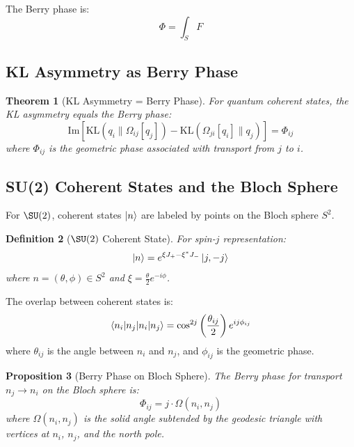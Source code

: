 \documentclass[11pt,a4paper]{article}
\newtheorem{theorem}{Theorem}[section]
\newtheorem{proposition}[theorem]{Proposition}
\newtheorem{definition}[theorem]{Definition}
\newcommand{\KL}{\mathrm{KL}}
\begin{document}
The Berry phase is:
\begin{equation}
    \Phi = \int_S F
\end{equation}

\subsection{KL Asymmetry as Berry Phase}

\begin{theorem}[KL Asymmetry = Berry Phase]\label{thm:berry}
For quantum coherent states, the KL asymmetry equals the Berry phase:
\begin{equation}
    \boxed{\mathrm{Im}\left[\KL(q_i \| \Omega_{ij}[q_j]) - \KL(\Omega_{ji}[q_i] \| q_j)\right] = \Phi_{ij}}
\end{equation}
where $\Phi_{ij}$ is the geometric phase associated with transport from $j$ to $i$.
\end{theorem}

\subsection{SU(2) Coherent States and the Bloch Sphere}

For $\SU(2)$, coherent states $\ket{n}$ are labeled by points on the Bloch sphere $S^2$.

\begin{definition}[$\SU(2)$ Coherent State]
For spin-$j$ representation:
\begin{equation}
    \ket{n} = e^{\xi J_+ - \xi^* J_-} \ket{j, -j}
\end{equation}
where $n = (\theta, \phi) \in S^2$ and $\xi = \frac{\theta}{2} e^{-i\phi}$.
\end{definition}

The overlap between coherent states is:
\begin{equation}
    \braket{n_i | n_j} = \cos^{2j}\left(\frac{\theta_{ij}}{2}\right) e^{ij\phi_{ij}}
\end{equation}
where $\theta_{ij}$ is the angle between $n_i$ and $n_j$, and $\phi_{ij}$ is the geometric phase.

\begin{proposition}[Berry Phase on Bloch Sphere]
The Berry phase for transport $n_j \to n_i$ on the Bloch sphere is:
\begin{equation}
    \Phi_{ij} = j \cdot \Omega(n_i, n_j)
\end{equation}
where $\Omega(n_i, n_j)$ is the solid angle subtended by the geodesic triangle with vertices at $n_i$, $n_j$, and the north pole.
\end{proposition}
\end{document}
